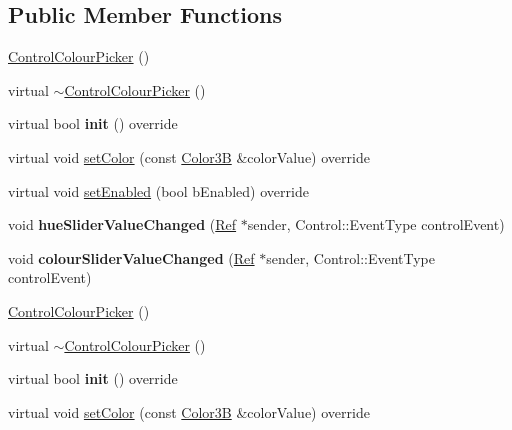 \subsection*{Public Member Functions}
\begin{DoxyCompactItemize}
\item 
\hyperlink{classControlColourPicker_a0e715fe722cdea50726f4f83c2c87aad}{Control\+Colour\+Picker} ()
\item 
virtual \hyperlink{classControlColourPicker_af28d0484443a9912c66c4a3e5f3027a2}{$\sim$\+Control\+Colour\+Picker} ()
\item 
\mbox{\label{classControlColourPicker_aab77718c2550ff035cae40566645979e}} 
virtual bool {\bfseries init} () override
\item 
virtual void \hyperlink{classControlColourPicker_af83da2a45dd64f202132830729711513}{set\+Color} (const \hyperlink{structColor3B}{Color3B} \&color\+Value) override
\item 
virtual void \hyperlink{classControlColourPicker_ac332c171d8aa481120139479c78da22b}{set\+Enabled} (bool b\+Enabled) override
\item 
\mbox{\label{classControlColourPicker_aa7b6798496b8a034114a63823ea02f48}} 
void {\bfseries hue\+Slider\+Value\+Changed} (\hyperlink{classRef}{Ref} $\ast$sender, Control\+::\+Event\+Type control\+Event)
\item 
\mbox{\label{classControlColourPicker_a48cf2cfec3297c34f3d24238474cb4ec}} 
void {\bfseries colour\+Slider\+Value\+Changed} (\hyperlink{classRef}{Ref} $\ast$sender, Control\+::\+Event\+Type control\+Event)
\item 
\hyperlink{classControlColourPicker_aa492eb2ff133a672f49a64fd966cb2be}{Control\+Colour\+Picker} ()
\item 
virtual \hyperlink{classControlColourPicker_af17bfe9f321085f3099d7a987461afe9}{$\sim$\+Control\+Colour\+Picker} ()
\item 
\mbox{\label{classControlColourPicker_a062d5b2a38f48e9d6ef617dac21493f9}} 
virtual bool {\bfseries init} () override
\item 
virtual void \hyperlink{classControlColourPicker_a23536124c2fbdad9fb93b0de8bf9b85e}{set\+Color} (const \hyperlink{structColor3B}{Color3B} \&color\+Value) override
\item 

\end{DoxyCompactItemize}
